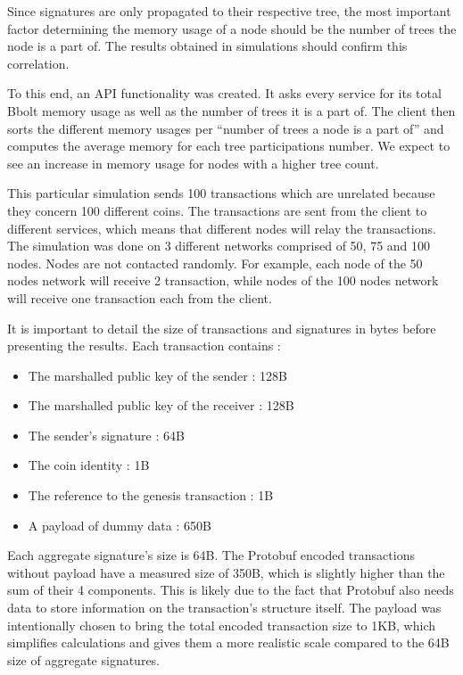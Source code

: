 \documentclass[11pt, a4paper, twoside, openright]{article}
\begin{document}
Since signatures are only propagated to their respective tree, the most important factor determining the memory usage of a node should be the number of trees the node is a part of. The results obtained in simulations should confirm this correlation.

To this end, an API functionality was created. It asks every service for its total Bbolt memory usage as well as the number of trees it is a part of. The client then sorts the different memory usages per ``number of trees a node is a part of'' and computes the average memory for each tree participations number. We expect to see an increase in memory usage for nodes with a higher tree count.

This particular simulation sends 100 transactions which are unrelated because they concern 100 different coins. The transactions are sent from the client to different services, which means that different nodes will relay the transactions. The simulation was done on 3 different networks comprised of 50, 75 and 100 nodes. Nodes are not contacted randomly. For example, each node of the 50 nodes network will receive 2 transaction, while nodes of the 100 nodes network will receive one transaction each from the client.

It is important to detail the size of transactions and signatures in bytes before presenting the results. Each transaction contains :
\begin{itemize}
\itemsep0em
\item The marshalled public key of the sender : 128B
\item The marshalled public key of the receiver : 128B
\item The sender's signature : 64B
\item The coin identity : 1B
\item The reference to the genesis transaction : 1B
\item A payload of dummy data : 650B
\end{itemize}

Each aggregate signature's size is 64B. The Protobuf encoded transactions without payload have a measured size of 350B, which is slightly higher than the sum of their 4 components. This is likely due to the fact that Protobuf also needs data to store information on the transaction's structure itself. The payload was intentionally chosen to bring the total encoded transaction size to 1KB, which simplifies calculations and gives them a more realistic scale compared to the 64B size of aggregate signatures.
\end{document}
